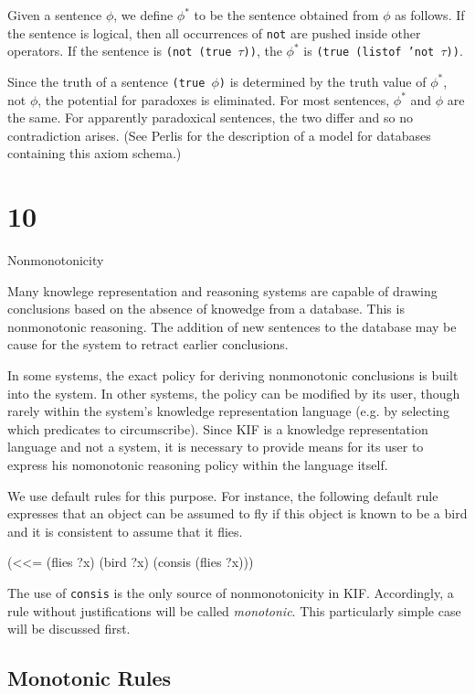 Given a sentence $\phi$, we define $\phi^*$ to be the sentence obtained from
$\phi$ as follows.  If the sentence is logical, then all occurrences of
{\tt not} are pushed inside other operators.  If the sentence is {\tt (not
(true $\tau$))}, the $\phi^*$ is {\tt (true (listof 'not $\tau$))}.

Since the truth of a sentence {\tt (true $\phi$)} is determined by the truth
value of $\phi^*$, not $\phi$, the potential for paradoxes is eliminated.  
For most sentences, $\phi^*$ and $\phi$ are the same.  For apparently
paradoxical sentences, the two differ and so no contradiction arises.
(See Perlis for the description of a model for databases containing this
axiom schema.)

\vfill\eject

\chapter{10}{Nonmonotonicity}

Many knowlege representation and reasoning systems are capable of drawing
conclusions based on the absence of knowedge from a database.  This is
nonmonotonic reasoning.  The addition of new sentences to the database
may be cause for the system to retract earlier conclusions.

In some systems, the exact policy for deriving nonmonotonic conclusions is
built into the system.  In other systems, the policy can be modified
by its user, though rarely within the system's knowledge representation
language (e.g. by selecting which predicates to circumscribe).  Since KIF
is a knowledge representation language and not a system, it is necessary
to provide means for its user to express his nomonotonic reasoning policy
within the language itself.

We use default rules for this purpose.  For instance, the following default
rule expresses that an object can be assumed to fly if this object is known to
be a bird and it is consistent to assume that it flies.

\medskip
\beginverbatim
(<<= (flies ?x) (bird ?x) (consis (flies ?x)))
\endverbatim
\medskip

The use of {\tt consis} is the only source of nonmonotonicity in KIF.
Accordingly, a rule without justifications will be called
{\it monotonic}. This particularly simple case will be discussed first.

\section{Monotonic Rules}

